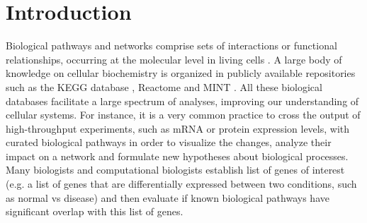





\section[Introduction]{Introduction}
Biological pathways and networks comprise sets of interactions or functional
relationships, occurring at the molecular level in living cells
\citep{adriaens2008public, barillot2012computational}.  A large body of
knowledge on cellular biochemistry is organized in publicly available
repositories such as the KEGG database \citep{kanehisa2011kegg}, Reactome
\citep{croft2014reactome} and MINT \citep{zanzoni2002mint}. All these
biological databases facilitate a large spectrum of analyses, improving our
understanding of cellular systems. For instance, it is a very common practice
to cross the output of high-throughput experiments, such as mRNA or protein
expression levels, with curated biological pathways in order to visualize the
changes, analyze their impact on a network and formulate new hypotheses about
biological processes. Many biologists and computational biologists establish
list of genes of interest (e.g. a list of genes that are differentially
expressed between two conditions, such as normal vs disease) and then evaluate
if known biological pathways have significant overlap with this list of genes. 


